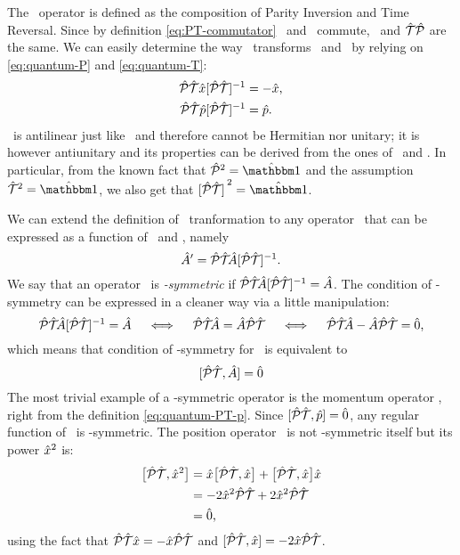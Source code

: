         The \hPT\ operator is defined as the composition of Parity Inversion and Time Reversal. Since by definition \eqref{eq:PT-commutator} \hP\ and \hT\ commute, \hPT\ and $\mathcal{\hat{T}}\mathcal{\hat{P}}$ are the same. We can easily determine the way \hPT\ transforms \hx\ and \hp\ by relying on \eqref{eq:quantum-P} and \eqref{eq:quantum-T}:
        \begin{align}
            \label{eq:quantum-PT-x}
            \hPT\hx\bqty*{\hPT}\!^{-1}
            &= -\hx
            \mycomma
            \\
            \label{eq:quantum-PT-p}
            \hPT\hp\bqty*{\hPT}\!^{-1}
            &= \hp
            \myperiod
        \end{align}
        \hPT\ is antilinear just like \hT\ and therefore cannot be Hermitian nor unitary; it is however antiunitary and its properties can be derived from the ones of \hP\ and \hT. In particular, from the known fact that $\hP^2 = \hidM$ and the assumption $\hT^2 = \hidM$, we also get that $\bqty*{\hPT}^2 = \hidM$. 

        We can extend the definition of \PT\ tranformation to any operator \hA\ that can be expressed as a function of \hx\ and \hp, namely
        \begin{equation}
            \label{eq:pt-transform}
            \hA' = \PTtransform{\hA}
            \myperiod
        \end{equation}
        We say that an operator \hA\ is \emph{\PT-symmetric} if $\PTtransform{\hA} = \hA$. The condition of \PT-symmetry can be expressed in a cleaner way via a little manipulation:
        \begin{equation*}
            \PTtransform{\hA} = \hA
            \quad\iff\quad
            \hPT\!\hA = \hA\hPT
            \quad\iff\quad
            \hPT\!\hA - \hA\hPT = \hzero
            \mycomma
        \end{equation*}
        which means that condition of \PT-symmetry for \hA\ is equivalent to
        \begin{equation}
            \label{eq:pt-symmetric-operator}
            \comm*{\hPT}{\hA}\! = \hzero
        \end{equation}
        The most trivial example of a \PT-symmetric operator is the momentum operator \hp, right from the definition \eqref{eq:quantum-PT-p}. Since $\comm*{\hPT}{\hp}\! = \hzero$, any regular function of \hp\ is \PT-symmetric. The position operator \hx\ is not \PT-symmetric itself but its power $\hat{x}^2$ is:
        \begin{align*}
            \bigl[\mathcal{\hat{P}}\mathcal{\hat{T}},\hat{x}^2\bigr]
            &= \hat{x} \bigl[\mathcal{\hat{P}}\mathcal{\hat{T}},\hat{x}\bigr] + \bigl[\mathcal{\hat{P}}\mathcal{\hat{T}},\hat{x}\bigr] \hat{x} \\
            &= -2\hat{x}^2\mathcal{\hat{P}}\mathcal{\hat{T}} + 2\hat{x}^2\mathcal{\hat{P}}\mathcal{\hat{T}} \\
            &= \hat{0} 
            \text{,}
        \end{align*}
        using the fact that $\mathcal{\hat{P}}\mathcal{\hat{T}} \hat{x} = -\hat{x} \mathcal{\hat{P}}\mathcal{\hat{T}}$ and $\comm*{\hPT}{\hx}\! = -2\hx\hPT$.

